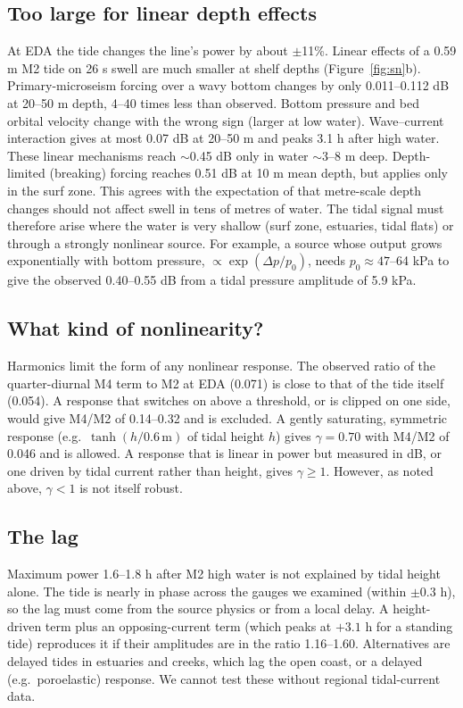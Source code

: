 \documentclass[11pt]{article}
\begin{document}
\subsection{Too large for linear depth effects}
At EDA the tide changes the line's power by about $\pm$11\%. Linear effects of a 0.59 m M2 tide on 26 s swell are much smaller at shelf depths (Figure~\ref{fig:sn}b). Primary-microseism forcing over a wavy bottom changes by only 0.011--0.112 dB at 20--50 m depth, 4--40 times less than observed. Bottom pressure and bed orbital velocity change with the wrong sign (larger at low water). Wave--current interaction gives at most 0.07 dB at 20--50 m and peaks 3.1 h after high water. These linear mechanisms reach $\sim$0.45 dB only in water $\sim$3--8 m deep. Depth-limited (breaking) forcing reaches 0.51 dB at 10 m mean depth, but applies only in the surf zone. This agrees with the expectation of \citet{poli2026} that metre-scale depth changes should not affect swell in tens of metres of water. The tidal signal must therefore arise where the water is very shallow (surf zone, estuaries, tidal flats) or through a strongly nonlinear source. For example, a source whose output grows exponentially with bottom pressure, $\propto\exp(\Delta p/p_0)$, needs $p_0\approx47$--64 kPa to give the observed 0.40--0.55 dB from a tidal pressure amplitude of 5.9 kPa.

\subsection{What kind of nonlinearity?}
Harmonics limit the form of any nonlinear response. The observed ratio of the quarter-diurnal M4 term to M2 at EDA (0.071) is close to that of the tide itself (0.054). A response that switches on above a threshold, or is clipped on one side, would give M4/M2 of 0.14--0.32 and is excluded. A gently saturating, symmetric response (e.g.\ $\tanh(h/0.6\,\mathrm{m})$ of tidal height $h$) gives $\gamma=0.70$ with M4/M2 of 0.046 and is allowed. A response that is linear in power but measured in dB, or one driven by tidal current rather than height, gives $\gamma\ge1$. However, as noted above, $\gamma<1$ is not itself robust.

\subsection{The lag}
Maximum power 1.6--1.8 h after M2 high water is not explained by tidal height alone. The tide is nearly in phase across the gauges we examined (within $\pm$0.3 h), so the lag must come from the source physics or from a local delay. A height-driven term plus an opposing-current term (which peaks at $+3.1$ h for a standing tide) reproduces it if their amplitudes are in the ratio 1.16--1.60. Alternatives are delayed tides in estuaries and creeks, which lag the open coast, or a delayed (e.g.\ poroelastic) response. We cannot test these without regional tidal-current data.
\end{document}
